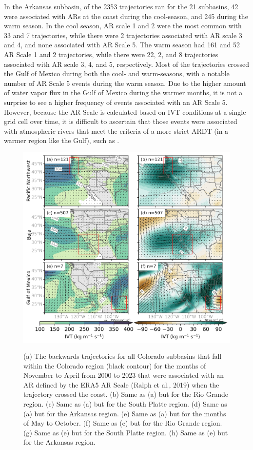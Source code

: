 \documentclass[draft]{agujournal2019}
\begin{document}
In the Arkansas subbasin, of the 2353 trajectories ran for the 21 subbasins, 42 were associated with ARs at the coast during the cool-season, and 245 during the warm season. In the cool season, AR scale 1 and 2 were the most common with 33 and 7 trajectories, while there were 2 trajectories associated with AR scale 3 and 4, and none associated with AR Scale 5. The warm season had 161 and 52 AR Scale 1 and 2 trajectories, while there were 22, 2, and 8 trajectories associated with AR scale 3, 4, and 5, respectively. Most of the trajectories crossed the Gulf of Mexico during both the cool- and warm-seasons, with a notable number of AR Scale 5 events during the warm season. Due to the higher amount of water vapor flux in the Gulf of Mexico during the warmer months, it is not a surprise to see a higher frequency of events associated with an AR Scale 5. However, because the AR Scale is calculated based on IVT conditions at a single grid cell over time, it is difficult to ascertain that those events were associated with atmospheric rivers that meet the criteria of a more strict ARDT (in a warmer region like the Gulf), such as . 

\begin{figure}
\noindent\includegraphics[width=\textwidth]{fig5.png}
\label{fig:spaghetti_plot}
\caption{(a) The backwards trajectories for all Colorado subbasins that fall within the Colorado region (black contour) for the months of November to April from 2000 to 2023 that were associated with an AR defined by the ERA5 AR Scale (Ralph et al., 2019) when the trajectory crossed the coast. (b) Same as (a) but for the Rio Grande region. (c) Same as (a) but for the South Platte region. (d) Same as (a) but for the Arkansas region. (e) Same as (a) but for the months of May to October. (f) Same as (e) but for the Rio Grande region. (g) Same as (e) but for the South Platte region. (h) Same as (e) but for the Arkansas region.}
\end{figure}
\end{document}
